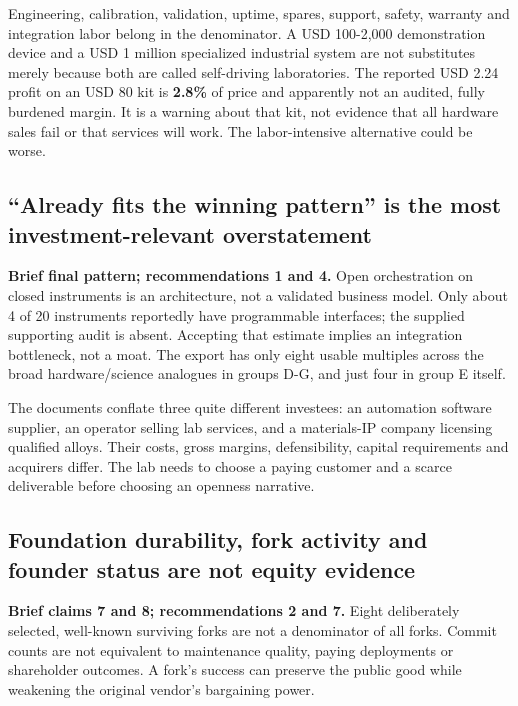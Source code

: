 Engineering, calibration, validation, uptime, spares, support, safety,
warranty and integration labor belong in the denominator. A USD
100-2,000 demonstration device and a USD 1 million specialized
industrial system are not substitutes merely because both are called
self-driving laboratories. The reported USD 2.24 profit on an USD 80 kit
is \textbf{2.8\%} of price and apparently not an audited, fully burdened
margin. It is a warning about that kit, not evidence that all hardware
sales fail or that services will work. The labor-intensive alternative
could be worse.

\subsection{``Already fits the winning pattern'' is the most
investment-relevant
overstatement}\label{already-fits-the-winning-pattern-is-the-most-investment-relevant-overstatement}

\textbf{Brief final pattern; recommendations 1 and 4.} Open
orchestration on closed instruments is an architecture, not a validated
business model. Only about 4 of 20 instruments reportedly have
programmable interfaces; the supplied supporting audit is absent.
Accepting that estimate implies an integration bottleneck, not a moat.
The export has only eight usable multiples across the broad
hardware/science analogues in groups D-G, and just four in group E
itself.

The documents conflate three quite different investees: an automation
software supplier, an operator selling lab services, and a materials-IP
company licensing qualified alloys. Their costs, gross margins,
defensibility, capital requirements and acquirers differ. The lab needs
to choose a paying customer and a scarce deliverable before choosing an
openness narrative.

\subsection{Foundation durability, fork activity and founder status are
not equity
evidence}\label{foundation-durability-fork-activity-and-founder-status-are-not-equity-evidence}

\textbf{Brief claims 7 and 8; recommendations 2 and 7.} Eight
deliberately selected, well-known surviving forks are not a denominator
of all forks. Commit counts are not equivalent to maintenance quality,
paying deployments or shareholder outcomes. A fork's success can
preserve the public good while weakening the original vendor's
bargaining power.

